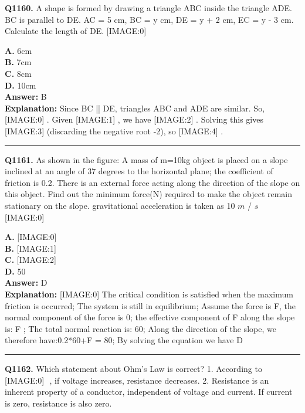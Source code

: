 \documentclass[12pt]{article}
\begin{document}
\noindent
\textbf{Q1160.} A shape is formed by drawing a triangle ABC inside the triangle ADE. BC is parallel to DE. AC = 5 cm, BC = y cm, DE = y + 2 cm, EC = y - 3 cm.
Calculate the length of DE.
[IMAGE:0]



\textbf{A.} 6cm \\
\textbf{B.} 7cm \\
\textbf{C.} 8cm \\
\textbf{D.} 10cm \\

\textbf{Answer:} B \\
\textbf{Explanation:} Since BC || DE, triangles ABC and ADE are similar.
So,
[IMAGE:0]
.
Given
[IMAGE:1]
, we have
[IMAGE:2]
. Solving this gives
[IMAGE:3]
(discarding the negative root -2), so
[IMAGE:4]
.

\hrule
\vspace{1em}


\noindent
\textbf{Q1161.} As shown in the figure: A mass of m=10kg object is placed on a slope inclined at an angle of 37 degrees to the horizontal plane; the coefficient of friction is 0.2. There is an external force acting along the direction of the slope on this object. Find out the minimum force(N) required to make the object remain stationary on the slope. gravitational acceleration is taken as 10
$𝑚$
/
$𝑠$
[IMAGE:0]



\textbf{A.} [IMAGE:0] \\
\textbf{B.} [IMAGE:1] \\
\textbf{C.} [IMAGE:2] \\
\textbf{D.} 50 \\

\textbf{Answer:} D \\
\textbf{Explanation:} [IMAGE:0]
The critical condition is satisfied when the maximum friction is occurred; The system is still in equilibrium; Assume the force is F, the normal component of the force is 0; the effective component of F along the slope is:
F
; The total normal reaction is: 60; Along the direction of the slope, we therefore have:0.2*60+F = 80; By solving the equation we have D

\hrule
\vspace{1em}


\noindent
\textbf{Q1162.} Which statement about Ohm’s Law is correct?
1.
According to
[IMAGE:0]
​
, if voltage increases, resistance decreases.
2.
Resistance is an inherent property of a conductor, independent of voltage and current.
If current is zero, resistance is also zero.
\end{document}
